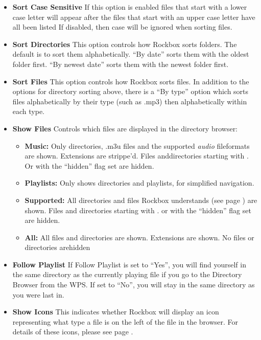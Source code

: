 \begin{itemize}
\item \textbf{Sort Case Sensitive}
  If this option is enabled files that start with a lower case letter will appear after the files that start with an upper case letter have all been listed  If disabled, then case will be ignored when sorting files.
\item \textbf{Sort Directories}
  This option controls how Rockbox sorts folders.  The default is to sort them alphabetically.  ``By date'' sorts them with the oldest folder first.  ``By newest date'' sorts them with the newest folder first.
  
\item \textbf{Sort Files}
  This option controls how Rockbox sorts files.  In addition to the options for directory sorting above, there is a ``By type'' option which sorts files alphabetically by their type (such as .mp3) then alphabetically within each type.

\item \textbf{\label{ref:ShowFiles}Show Files}
  Controls which files are displayed in the directory browser:

  \begin{itemize}
  \item \textbf{Music: }
    Only directories, .m3u files and the supported \emph{audio} fileformats are shown. Extensions are strippe'd. Files anddirectories starting with . Or with the ``hidden'' flag set are hidden.
  \item \textbf{Playlists:} 
    Only shows directories and playlists, for simplified navigation.
  \item \textbf{Supported:} 
    All directories and files Rockbox understands (see page \pageref{ref:Supportedfileformats}) are shown. Files and directories starting with . or with the ``hidden'' flag set are hidden.
  \item \textbf{All:}
    All files and directories are shown. Extensions are shown. No files or directories arehidden
  \end{itemize}
  
\item \textbf{Follow Playlist}
  If Follow Playlist is set to ``Yes'', you will find yourself in the same directory as the currently playing file if you go to the Directory Browser from the WPS. If set to ``No'', you will stay in the same directory as you were last in.

\item \textbf{Show Icons}
  This indicates whether Rockbox will display an icon representing what type a file is on the left of the file in the browser.  For details of these icons, please see page \pageref{ref:Supportedfileformats}.
\end{itemize}

